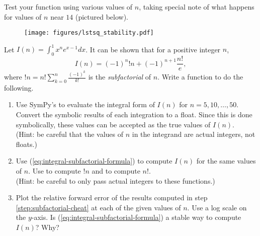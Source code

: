Test your function using various values of $n$, taking special note of what happens for values of $n$ near $14$ (pictured below).

\begin{figure}[H]
    \centering
    \texttt{[image: figures/lstsq\_stability.pdf]}
\end{figure}

Let $I(n) = \int_0^1 x^n e^{x - 1} dx$.
It can be shown that for a positive integer $n$,
\begin{equation}
I(n) = \left(-1\right)^{n} !n + \left(-1\right)^{n + 1} \frac{n!}{e},
\label{eq:integral-subfactorial-formula}
\end{equation}
where $!n=n!\sum_{k=0}^{n} \frac{(-1)^k}{k!}$ is the \emph{subfactorial} of $n$.
Write a function to do the following.
\begin{enumerate}
\item Use SymPy's  to evaluate the integral form of $I(n)$ for $n=5,10,\ldots,50$.
Convert the symbolic results of each integration to a float.
Since this is done symbolically, these values can be accepted as the true values of $I(n)$.
\\(Hint: be careful that the values of $n$ in the integrand are actual integers, not floats.)

\item Use (\ref{eq:integral-subfactorial-formula}) to compute $I(n)$ for the same values of $n$.
Use  to compute $!n$ and  to compute $n!$.
\\(Hint: be careful to only pass actual integers to these functions.)
\label{step:subfactorial-cheat}

\item Plot the relative forward error of the results computed in step \ref{step:subfactorial-cheat} at each of the given values of $n$.
Use a log scale on the $y$-axis.
Is (\ref{eq:integral-subfactorial-formula}) a stable way to compute $I(n)$?
Why?
\end{enumerate}
